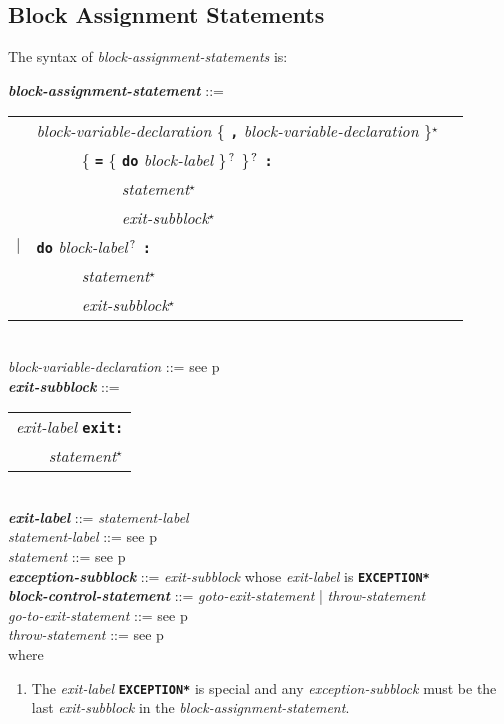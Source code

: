 \documentclass[12pt]{article}
\newcommand{\TT}[1]{{\tt \bfseries #1}}
\newcommand{\STAR}{{\Large $^\star$}}
\newcommand{\QMARK}{{$^{\,\mbox{\footnotesize ?}}$}}
\newcommand{\ttkey}[1]{{\tt \bfseries #1}}
\newcommand{\emkey}[1]{{\em \bfseries #1}}
\newcommand{\pagref}[1]{p\pageref{#1}}
\newenvironment{indpar}[1][0.3in]%
	{\begin{list}{}%
		     {\setlength{\itemsep}{0in}%
		      \setlength{\topsep}{0in}%
		      \setlength{\parsep}{1ex}%
		      \setlength{\labelwidth}{#1}%
		      \setlength{\leftmargin}{#1}%
		      \addtolength{\leftmargin}{\labelsep}}%
	 \item}%
	{\end{list}}
\begin{document}
\subsection{Block Assignment Statements}
\label{BLOCK-ASSIGNMENT-STATEMENTS}

The syntax of {\em block-assignment-statements} is:

\begin{indpar}
\emkey{block-assignment-statement} ::= \\
\hspace*{0.5in}\begin{tabular}[t]{@{}rll}
        & {\em block-variable-declaration}
                \{ \TT{,} {\em block-variable-declaration} \}\STAR{} \\
	& ~~~~~ \{ \TT{=} \{ \ttkey{do} {\em block-label} \}\QMARK{} \}\QMARK{}
		   \TT{:} \\
        & ~~~~~~~~~~ {\em statement}\STAR{} \\
        & ~~~~~~~~~~ {\em exit-subblock}\STAR{} \\
    $|$ & \ttkey{do} {\em block-label}\QMARK{} \TT{:} \\
        & ~~~~~ {\em statement}\STAR{} \\
        & ~~~~~ {\em exit-subblock}\STAR{} \\
    \end{tabular}
\\[0.5ex]
{\em block-variable-declaration} ::=
    see \pagref{BLOCK-VARIABLE-DECLARATION}
\\[0.5ex]
\emkey{exit-subblock}\label{EXIT-SUBBLOCK} ::=
    \begin{tabular}[t]{l}
    {\em exit-label} \ttkey{exit}\TT{:} \\
    \TT{~~~~}{\em statement}\STAR{} \\
    \end{tabular} \\
\emkey{exit-label} ::= {\em statement-label}
\\[0.5ex]
{\em statement-label} ::= see \pagref{STATEMENT-LABEL} \\
{\em statement} ::= see \pagref{STATEMENT}
\\[0.5ex]
\emkey{exception-subblock}\label{EXCEPTION-SUBBLOCK} ::=
    {\em exit-subblock} whose {\em exit-label} is \ttkey{*EXCEPTION*}
\\[0.5ex]
\emkey{block-control-statement}\label{BLOCK-CONTROL-STATEMENT}
	::= {\em goto-exit-statement} | {\em throw-statement} \\
{\em go-to-exit-statement} ::= see \pagref{GO-TO-STATEMENT} \\
{\em throw-statement} ::= see \pagref{THROW-STATEMENT}
\\[2.0ex]
where
\begin{enumerate}

\item The {\em exit-label} \ttkey{*EXCEPTION*} is special and
any {\em exception-subblock} must be the last {\em exit-subblock}
in the {\em block-assignment-statement}.

\end{enumerate}
\end{indpar}
\end{document}
